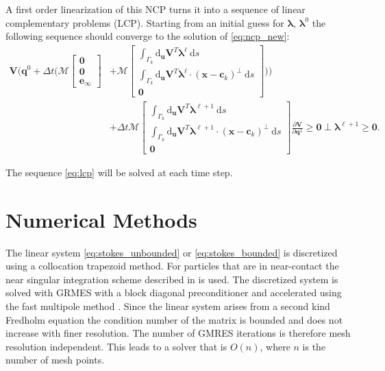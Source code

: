 \documentclass[preprint, 10pt]{elsarticle}
\begin{document}
A first order linearization of this NCP turns it into a sequence of linear complementary problems (LCP). Starting from an initial guess for $\pmb{\lambda}$, $\pmb{\lambda}^0$ the following sequence should converge to the solution of \eqref{eq:ncp_new}:
\begin{equation}\label{eq:lcp}\begin{aligned}
\mathbf{V}\biggl(\mathbf{q}^0 + \Delta t\biggl(\mathcal{M}\begin{bmatrix}\mathbf{0}\\\mathbf{0}\\\mathbf{e}_\infty\end{bmatrix} &+ \mathcal{M}\begin{bmatrix} \int_{\Gamma_k} \text{d}_\mathbf{u}\mathbf{V}^T\pmb{\lambda}^\ell~\text{d}s\\ \int_{\Gamma_k}  \text{d}_\mathbf{u}\mathbf{V}^T\pmb{\lambda}^\ell\cdot(\mathbf{x}-\mathbf{c}_k)^\perp~\text{d}s \\\mathbf{0}\end{bmatrix}\biggr)\biggr) \\
&+ \Delta t \mathcal{M}\begin{bmatrix}\int_{\Gamma_k} \text{d}_\mathbf{u}\mathbf{V}^T\pmb{\lambda}^{\ell+1}~\text{d}s\\ \int_{\Gamma_k}  \text{d}_\mathbf{u}\mathbf{V}^T\pmb{\lambda}^{\ell+1}\cdot(\mathbf{x}-\mathbf{c}_k)^\perp~\text{d}s \\\mathbf{0}\end{bmatrix}\frac{\partial\mathbf{V}}{\partial \mathbf{q}^1} \geq \mathbf{0} \perp \pmb{\lambda}^{\ell+1} \geq \mathbf{0}.\end{aligned}\end{equation}

The sequence \eqref{eq:lcp} will be solved at each time step. 



		
\section{Numerical Methods\label{s:method}} 

The linear system \eqref{eq:stokes_unbounded} or \eqref{eq:stokes_bounded} is discretized using a collocation trapezoid method. For particles that are in near-contact the near singular integration scheme described in \cite{Quaife2014, Ying2006} is used. The discretized system is solved with GRMES \cite{Saad1986} with a block diagonal preconditioner and accelerated using the fast multipole method \cite{Greengard1987}.  Since the linear system arises from a second kind Fredholm equation the condition number of the matrix is bounded and does not increase with finer resolution. The number of GMRES iterations is therefore mesh resolution independent. This leads to a solver that is $O(n)$, where $n$ is the number of mesh points. 
\end{document}
